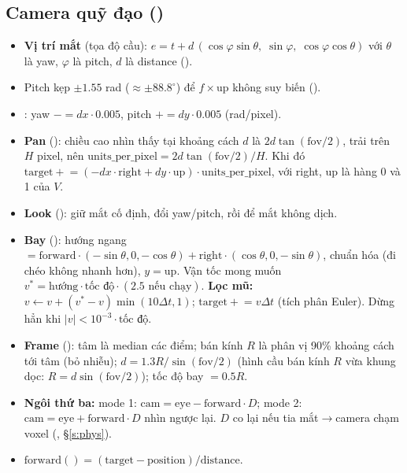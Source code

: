\subsection{Camera quỹ đạo ()}
\begin{itemize}
\item \textbf{Vị trí mắt} (tọa độ cầu): $e=t+d\,(\cos\varphi\sin\theta,\;\sin\varphi,\;\cos\varphi\cos\theta)$ với $\theta$ là yaw, $\varphi$ là pitch, $d$ là distance ().
\item Pitch kẹp $\pm1.55$ rad ($\approx\pm88.8^\circ$) để $f\times\mathrm{up}$ không suy biến ().
\item {}: yaw $-=dx\cdot0.005$, pitch $+=dy\cdot0.005$ (rad/pixel).
\item \textbf{Pan} (): chiều cao nhìn thấy tại khoảng cách $d$ là $2d\tan(\mathrm{fov}/2)$, trải trên $H$ pixel, nên $\mathrm{units\_per\_pixel}=2d\tan(\mathrm{fov}/2)/H$. Khi đó $\mathrm{target}\mathrel{+}=(-dx\cdot\mathrm{right}+dy\cdot\mathrm{up})\cdot\mathrm{units\_per\_pixel}$, với right, up là hàng 0 và 1 của $V$.
\item \textbf{Look} (): giữ mắt cố định, đổi yaw/pitch, rồi  để mắt không dịch.
\item \textbf{Bay} (): hướng ngang $=\mathrm{forward}\cdot(-\sin\theta,0,-\cos\theta)+\mathrm{right}\cdot(\cos\theta,0,-\sin\theta)$, chuẩn hóa (đi chéo không nhanh hơn), $y=\mathrm{up}$. Vận tốc mong muốn $v^*=\text{hướng}\cdot\text{tốc độ}\cdot(2.5\text{ nếu chạy})$. \textbf{Lọc mũ:} $v\leftarrow v+(v^*-v)\min(10\Delta t,1)$; $\mathrm{target}\mathrel{+}=v\Delta t$ (tích phân Euler). Dừng hẳn khi $|v|<10^{-3}\cdot\text{tốc độ}$.
\item \textbf{Frame} (): tâm là median các điểm; bán kính $R$ là phân vị 90\% khoảng cách tới tâm (bỏ nhiễu); $d=1.3R/\sin(\mathrm{fov}/2)$ (hình cầu bán kính $R$ vừa khung dọc: $R=d\sin(\mathrm{fov}/2)$); tốc độ bay $=0.5R$.
\item \textbf{Ngôi thứ ba:} mode 1: $\mathrm{cam}=\mathrm{eye}-\mathrm{forward}\cdot D$; mode 2: $\mathrm{cam}=\mathrm{eye}+\mathrm{forward}\cdot D$ nhìn ngược lại. $D$ co lại nếu tia mắt$\to$camera chạm voxel (, \S\ref{s:phys}).
\item $\mathrm{forward}()=(\mathrm{target}-\mathrm{position})/\mathrm{distance}$.
\end{itemize}

